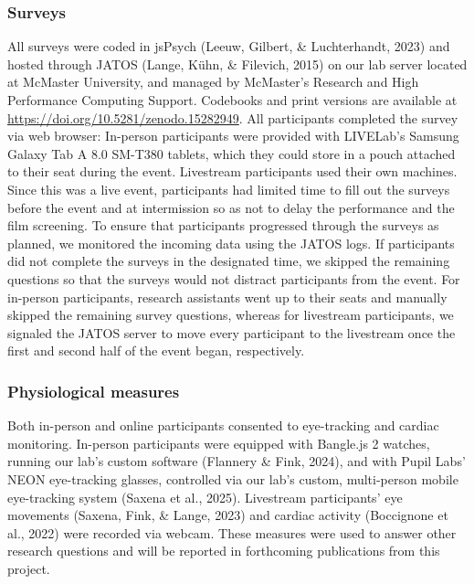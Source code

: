 \documentclass[
  man,floatsintext]{apa6}
\begin{document}
\subsubsection{Surveys}\label{surveys}

All surveys were coded in jsPsych (Leeuw, Gilbert, \& Luchterhandt, 2023) and hosted through JATOS (Lange, Kühn, \& Filevich, 2015) on our lab server located at McMaster University, and managed by McMaster's Research and High Performance Computing Support. Codebooks and print versions are available at \url{https://doi.org/10.5281/zenodo.15282949}. All participants completed the survey via web browser: In-person participants were provided with LIVELab's Samsung Galaxy Tab A 8.0 SM-T380 tablets, which they could store in a pouch attached to their seat during the event. Livestream participants used their own machines. Since this was a live event, participants had limited time to fill out the surveys before the event and at intermission so as not to delay the performance and the film screening. To ensure that participants progressed through the surveys as planned, we monitored the incoming data using the JATOS logs. If participants did not complete the surveys in the designated time, we skipped the remaining questions so that the surveys would not distract participants from the event. For in-person participants, research assistants went up to their seats and manually skipped the remaining survey questions, whereas for livestream participants, we signaled the JATOS server to move every participant to the livestream once the first and second half of the event began, respectively.

\subsubsection{Physiological measures}\label{physiological-measures}

Both in-person and online participants consented to eye-tracking and cardiac monitoring. In-person participants were equipped with Bangle.js 2 watches, running our lab's custom software (Flannery \& Fink, 2024), and with Pupil Labs' NEON eye-tracking glasses, controlled via our lab's custom, multi-person mobile eye-tracking system (Saxena et al., 2025). Livestream participants' eye movements (Saxena, Fink, \& Lange, 2023) and cardiac activity (Boccignone et al., 2022) were recorded via webcam. These measures were used to answer other research questions and will be reported in forthcoming publications from this project.
\end{document}
